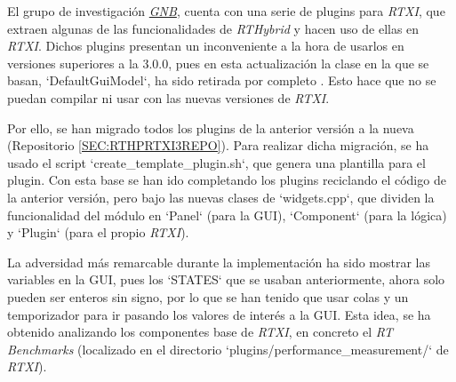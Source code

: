 
El grupo de investigación \href{http://arantxa.ii.uam.es/~gnb/}{\textit{GNB}}, cuenta con una serie de plugins para \textit{RTXI}, que extraen algunas de las funcionalidades de \textit{RTHybrid} \cite{Reyes-Sanchez2020, Amaducci2019} y hacen uso de ellas en \textit{RTXI}. Dichos plugins presentan un inconveniente a la hora de usarlos en versiones superiores a la 3.0.0, pues en esta actualización la clase en la que se basan, `DefaultGuiModel`, ha sido retirada por completo \cite{RTXI2023}. Esto hace que no se puedan compilar ni usar con las nuevas versiones de \textit{RTXI}.

Por ello, se han migrado todos los plugins de la anterior versión a la nueva (Repositorio \ref{SEC:RTHPRTXI3REPO}). Para realizar dicha migración, se ha usado el script `create\_template\_plugin.sh`, que genera una plantilla para el plugin. Con esta base se han ido completando los plugins reciclando el código de la anterior versión, pero bajo las nuevas clases de `widgets.cpp`, que dividen la funcionalidad del módulo en `Panel` (para la GUI), `Component` (para la lógica) y `Plugin` (para el propio \textit{RTXI}).

La adversidad más remarcable durante la implementación ha sido mostrar las variables en la GUI, pues los `STATES` que se usaban anteriormente, ahora solo pueden ser enteros sin signo, por lo que se han tenido que usar colas y un temporizador para ir pasando los valores de interés a la GUI. Esta idea, se ha obtenido analizando los componentes base de \textit{RTXI}, en concreto el \textit{RT Benchmarks} (localizado en el directorio `plugins/performance\_measurement/` de \textit{RTXI}).
